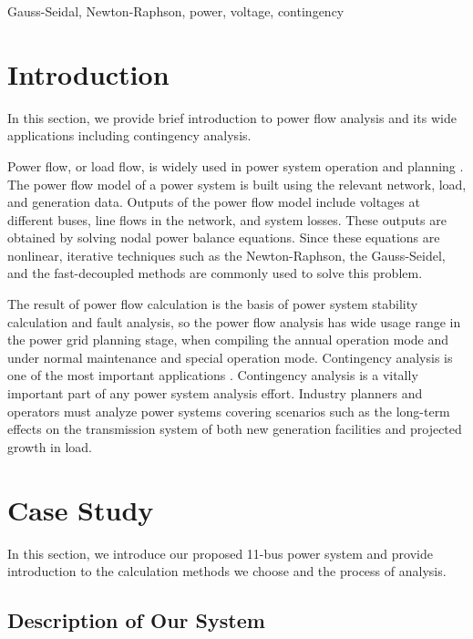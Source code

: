 \documentclass[conference]{IEEEtran}
\begin{document}
\begin{IEEEkeywords}
Gauss-Seidal, Newton-Raphson, power, voltage, contingency
\end{IEEEkeywords}

\section{Introduction}
In this section, we provide brief introduction to power flow analysis and its wide applications including contingency analysis.

Power flow, or load flow, is widely used in power system operation and planning \cite{b1}. The power flow model of a power system is built using the relevant network, load, and generation data. Outputs of the power flow model include voltages at different buses, line flows in the network, and system losses. These outputs are obtained by solving nodal power balance equations. Since these equations are nonlinear, iterative techniques such as the Newton-Raphson, the Gauss-Seidel, and the fast-decoupled methods are commonly used to solve this problem.

The result of power flow calculation is the basis of power system stability calculation and fault analysis, so the power flow analysis has wide usage range in the power grid planning stage, when compiling the annual operation mode and under normal maintenance and special operation mode. Contingency analysis is one of the most important applications \cite{b2}. Contingency analysis is a vitally important part of any power system analysis effort. Industry planners and operators must analyze power systems covering scenarios such as the long-term effects on the transmission system of both new generation facilities and projected growth in load.

\section{Case Study}
In this section, we introduce our proposed 11-bus power system and provide introduction to the calculation methods we choose and the process of analysis.

\subsection{Description of Our System}
\end{document}
